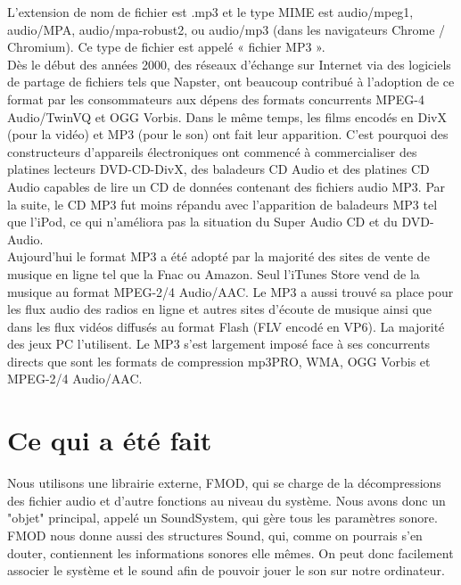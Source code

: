 \documentclass[12pt,a4paper]{report}
\begin{document}
L'extension de nom de fichier est .mp3 et le type MIME est audio/mpeg1, audio/MPA, audio/mpa-robust2, ou audio/mp3 (dans les navigateurs Chrome / Chromium). Ce type de fichier est appelé « fichier MP3 ».\\

Dès le début des années 2000, des réseaux d'échange sur Internet via des logiciels de partage de fichiers tels que Napster, ont beaucoup contribué à l'adoption de ce format par les consommateurs aux dépens des formats concurrents MPEG-4 Audio/TwinVQ et OGG Vorbis. Dans le même temps, les films encodés en DivX (pour la vidéo) et MP3 (pour le son) ont fait leur apparition. C'est pourquoi des constructeurs d'appareils électroniques ont commencé à commercialiser des platines lecteurs DVD-CD-DivX, des baladeurs CD Audio et des platines CD Audio capables de lire un CD de données contenant des fichiers audio MP3. Par la suite, le CD MP3 fut moins répandu avec l'apparition de baladeurs MP3 tel que l'iPod, ce qui n'améliora pas la situation du Super Audio CD et du DVD-Audio.\\

Aujourd'hui le format MP3 a été adopté par la majorité des sites de vente de musique en ligne tel que la Fnac ou Amazon. Seul l'iTunes Store vend de la musique au format MPEG-2/4 Audio/AAC. Le MP3 a aussi trouvé sa place pour les flux audio des radios en ligne et autres sites d'écoute de musique ainsi que dans les flux vidéos diffusés au format Flash (FLV encodé en VP6). La majorité des jeux PC l'utilisent. Le MP3 s'est largement imposé face à ses concurrents directs que sont les formats de compression mp3PRO, WMA, OGG Vorbis et MPEG-2/4 Audio/AAC.\\

\section{Ce qui a été fait}

Nous utilisons une librairie externe, FMOD, qui se charge de la décompressions des fichier audio et d'autre fonctions au niveau du système. Nous avons donc un "objet" principal, appelé un SoundSystem, qui gère tous les paramètres sonore. FMOD nous donne aussi des structures Sound, qui, comme on pourrais s'en douter, contiennent les informations sonores elle mêmes. On peut donc facilement associer le système et le sound afin de pouvoir jouer le son sur notre ordinateur.\\
\end{document}
